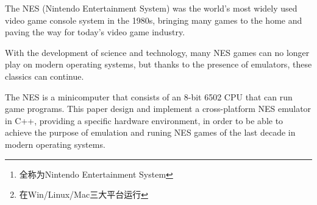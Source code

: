 \documentclass[a4paper]{ltxdoc}
\begin{document}





\begin{abstract}
	NES\footnote{全称为Nintendo Entertainment System}(任天堂娱乐系统)在20世纪80年代是世界上使用最广泛的电子游戏终端，其将许多游戏带入了家庭，并为当今电子游戏产业铺平了道路。

	随着科技的发展，许多NES游戏已经无法在当今系统上游玩，然而归功于模拟器的存在，使得这些经典能够延续下去。

	NES是一个由8位6502 CPU组成的微型计算机，能够有条不絮地运行游戏程序。本课题设计并用C++实现一个跨平台\footnote{在Win/Linux/Mac三大平台运行}的NES模拟系统，提供一个具体的硬件环境，以达到在现代操作系统中能够模拟并运行上个年代的NES游戏的目的。

\end{abstract}

\begin{abstractEn}
	The NES (Nintendo Entertainment System) was the world's most widely used video game console system in the 1980s, bringing many games to the home and paving the way for today's video game industry.

	With the development of science and technology, many NES games can no longer play on modern operating systems, but thanks to the presence of emulators, these classics can continue.

	The NES is a minicomputer that consists of an 8-bit 6502 CPU that can run game programs. This paper design and implement a cross-platform NES emulator in C++, providing a specific hardware environment, in order to be able to achieve the purpose of emulation and runing NES games of the last decade in modern operating systems.
\end{abstractEn}

{
\setlength{\cftfignumwidth}{3.5em}
\setlength{\cfttabnumwidth}{3.5em}
\clearpage
\tableofcontents
{}

\clearpage
\listoffigures

\clearpage
\listoftables

}

\fancyhead{}
\pagestyle{fancy}
\end{document}
